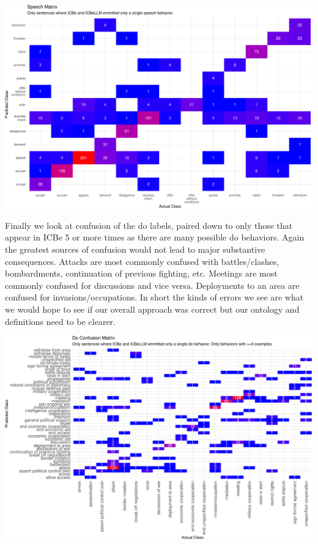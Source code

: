 \documentclass[
  letterpaper,
  DIV=11,
  numbers=noendperiod]{scrartcl}
\begin{document}
\includegraphics{arxiv_Douglass_et_al_2024_ICBeLLM_files/figure-latex/unnamed-chunk-11-1.pdf}

Finally we look at confusion of the do labels, paired down to only those
that appear in ICBe 5 or more times as there are many possible do
behaviors. Again the greatest sources of confusion would not lead to
major substantive consequences. Attacks are most commonly confused with
battles/clashes, bombardments, continuation of previous fighting, etc.
Meetings are most commonly confused for discussions and vice versa.
Deployments to an area are confused for invasions/occupations. In short
the kinds of errors we see are what we would hope to see if our overall
approach was correct but our ontology and definitions need to be
clearer.

\includegraphics{arxiv_Douglass_et_al_2024_ICBeLLM_files/figure-latex/unnamed-chunk-13-1.pdf}
\end{document}
